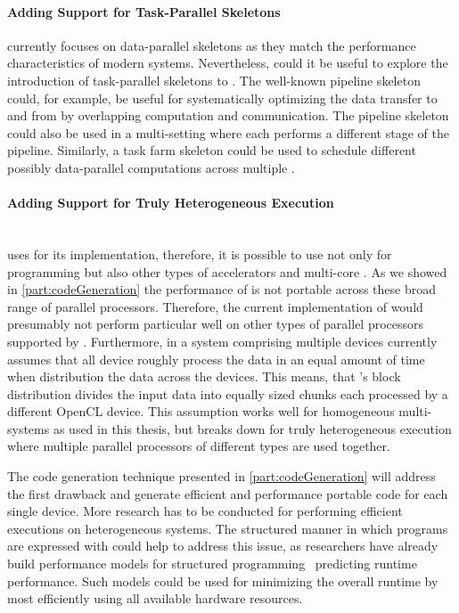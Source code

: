 \paragraph{Adding Support for Task-Parallel Skeletons}
\SkelCL currently focuses on data-parallel skeletons as they match the performance characteristics of modern \GPU systems.
Nevertheless, could it be useful to explore the introduction of task-parallel skeletons to \SkelCL.
The well-known pipeline skeleton could, for example, be useful for systematically optimizing the data transfer to and from \GPUs by overlapping computation and communication.
The pipeline skeleton could also be used in a multi-\GPU setting where each \GPUs performs a different stage of the pipeline.
Similarly, a task farm skeleton could be used to schedule different possibly data-parallel computations across multiple \GPUs.

\paragraph{Adding Support for Truly Heterogeneous Execution}\hfill\\
\SkelCL uses \OpenCL for its implementation, therefore, it is possible to use \SkelCL not only for programming \GPUs but also other types of accelerators and multi-core \CPUs.
As we showed in \autoref{part:codeGeneration} the performance of \OpenCL is not portable across these broad range of parallel processors.
Therefore, the current implementation of \SkelCL would presumably not perform particular well on other types of parallel processors supported by \OpenCL.
Furthermore, in a system comprising multiple \OpenCL devices \SkelCL currently assumes that all device roughly process the data in an equal amount of time when distribution the data across the devices.
This means, that \SkelCL's block distribution divides the input data into equally sized chunks each processed by a different OpenCL device.
This assumption works well for homogeneous multi-\GPU systems as used in this thesis, but breaks down for truly heterogeneous execution where multiple parallel processors of different types are used together.

The code generation technique presented in \autoref{part:codeGeneration} will address the first drawback and generate efficient and performance portable code for each single \OpenCL device.
More research has to be conducted for performing efficient executions on heterogeneous systems.
The structured manner in which programs are expressed with \SkelCL could help to address this issue, as researchers have already build performance models for structured programming~\cite{HayashiC02,BischofGK03,Alt2007,DarlingtonFHKSW93,StegmeierFrJAUn2015} predicting runtime performance.
Such models could be used for minimizing the overall runtime by most efficiently using all available hardware resources.


